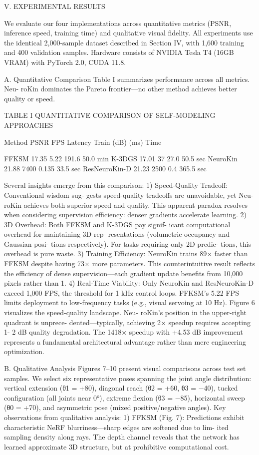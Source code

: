 \documentclass[10pt,twocolumn,letterpaper]{article}
\begin{document}
V. EXPERIMENTAL RESULTS

We evaluate our four implementations across quantitative metrics (PSNR, inference speed, training time) and qualitative visual fidelity. All experiments use the identical 2,000-sample dataset described in Section IV, with 1,600 training and 400 validation samples. Hardware consists of NVIDIA Tesla T4 (16GB VRAM) with PyTorch 2.0, CUDA 11.8.

A. Quantitative Comparison Table I summarizes performance across all metrics. Neu- roKin dominates the Pareto frontier—no other method achieves better quality or speed.

TABLE I QUANTITATIVE COMPARISON OF SELF-MODELING APPROACHES

Method PSNR FPS Latency Train (dB) (ms) Time

FFKSM 17.35 5.22 191.6 50.0 min K-3DGS 17.01 37 27.0 50.5 sec NeuroKin 21.88 7400 0.135 33.5 sec ResNeuroKin-D 21.23 2500 0.4 365.5 sec

Several insights emerge from this comparison: 1) Speed-Quality Tradeoff: Conventional wisdom sug- gests speed-quality tradeoffs are unavoidable, yet Neu- roKin achieves both superior speed and quality. This apparent paradox resolves when considering supervision efficiency: denser gradients accelerate learning. 2) 3D Overhead: Both FFKSM and K-3DGS pay signif- icant computational overhead for maintaining 3D rep- resentations (volumetric occupancy and Gaussian posi- tions respectively). For tasks requiring only 2D predic- tions, this overhead is pure waste. 3) Training Efficiency: NeuroKin trains 89× faster than FFKSM despite having 73× more parameters. This counterintuitive result reflects the efficiency of dense supervision—each gradient update benefits from 10,000 pixels rather than 1. 4) Real-Time Viability: Only NeuroKin and ResNeuroKin-D exceed 1,000 FPS, the threshold for 1 kHz control loops. FFKSM’s 5.22 FPS limits deployment to low-frequency tasks (e.g., visual servoing at 10 Hz). Figure 6 visualizes the speed-quality landscape. Neu- roKin’s position in the upper-right quadrant is unprece- dented—typically, achieving 2× speedup requires accepting 1- 2 dB quality degradation. The 1418× speedup with +4.53 dB improvement represents a fundamental architectural advantage rather than mere engineering optimization.

B. Qualitative Analysis Figures 7–10 present visual comparisons across test set samples. We select six representative poses spanning the joint angle distribution: vertical extension (θ1 = +80), diagonal reach (θ2 = +60, θ3 = −40), tucked configuration (all joints near 0°), extreme flexion (θ3 = −85), horizontal sweep (θ0 = +70), and asymmetric pose (mixed positive/negative angles). Key observations from qualitative analysis: 1) FFKSM (Fig. 7): Predictions exhibit characteristic NeRF blurriness—sharp edges are softened due to lim- ited sampling density along rays. The depth channel reveals that the network has learned approximate 3D structure, but at prohibitive computational cost.
\end{document}
